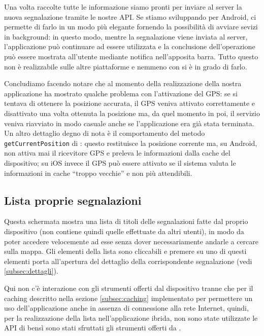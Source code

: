 			Una volta raccolte tutte le informazione siamo pronti per inviare
			al server la nuova segnalazione tramite le nostre API. Se stiamo
			sviluppando per Android, \tisdk{} ci permette di farlo in un modo
			più elegante fornendo la possibilità di avviare sevizi in
			background: in questo modo, mentre la segnalazione viene inviata al
			server, l'applicazione può continuare ad essere utilizzata e la
			conclusione dell'operazione	può essere mostrata all'utente mediante
			notifica nell'apposita barra. Tutto questo non è realizzabile sulle
			altre piattaforme e nemmeno con \pg{} si è in grado di farlo.
			
			Concludiamo facendo notare che al momento della realizzazione della
			nostra applicazione \pg{} ha mostrato qualche problema con
			l'attivazione del GPS: se si tentava di ottenere la posizione
			accurata, il GPS veniva attivato correttamente e disattivato una
			volta ottenuta la posizione ma, da quel momento in poi, il servizio
			veniva riavviato in modo casuale anche se l'applicazione era già
			stata terminata. Un altro dettaglio degno di nota è il comportamento
			del metodo \texttt{getCurrentPosition} di \tisdk{}: questo
			restituisce la posizione corrente ma, su Android, non attiva mai il
			ricevitore GPS e preleva le informazioni dalla cache del
			dispositivo; su iOS invece il GPS può essere attivato se il sistema
			valuta le informazioni in cache ``troppo vecchie'' e non più
			attendibili.
			
		\subsection{Lista proprie segnalazioni}
		\label{subsec:proprie}
			Questa schermata mostra una lista di titoli delle segnalazioni fatte
			dal proprio dispositivo (non contiene quindi quelle effettuate da altri 
			utenti), in modo da poter accedere velocemente ad esse 
			senza dover necessariamente andarle a cercare sulla mappa.
			Gli elementi della lista sono cliccabili e premere su uno di questi 
			elementi porta all'apertura del dettaglio della corrispondente 
			segnalazione (vedi \ref{subsec:dettagli}).
			
			Qui non c'è interazione con gli strumenti offerti dal dispositivo
			tranne che per il caching descritto nella sezione \ref{subsec:caching}
			implementato per permettere un uso dell'applicazione 
			anche in assenza di connessione alla rete Internet, 
			quindi, per la realizzazione della lista nell'applicazione ibrida, non sono
            state utilizzate le API di \pg{} bensì sono stati sfruttati gli
            strumenti offerti da \kendomob{}.
			
